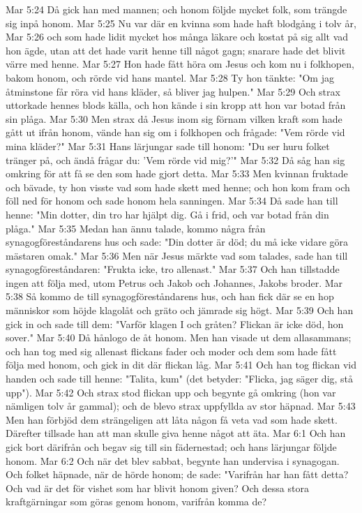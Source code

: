 Mar 5:24  Då gick han med mannen; och honom följde mycket folk, som trängde sig inpå honom.
Mar 5:25  Nu var där en kvinna som hade haft blodgång i tolv år,
Mar 5:26  och som hade lidit mycket hos många läkare och kostat på sig allt vad hon ägde, utan att det hade varit henne till något gagn; snarare hade det blivit värre med henne.
Mar 5:27  Hon hade fått höra om Jesus och kom nu i folkhopen, bakom honom, och rörde vid hans mantel.
Mar 5:28  Ty hon tänkte: "Om jag åtminstone får röra vid hans kläder, så bliver jag hulpen."
Mar 5:29  Och strax uttorkade hennes blods källa, och hon kände i sin kropp att hon var botad från sin plåga.
Mar 5:30  Men strax då Jesus inom sig förnam vilken kraft som hade gått ut ifrån honom, vände han sig om i folkhopen och frågade: "Vem rörde vid mina kläder?"
Mar 5:31  Hans lärjungar sade till honom: "Du ser huru folket tränger på, och ändå frågar du: 'Vem rörde vid mig?'"
Mar 5:32  Då såg han sig omkring för att få se den som hade gjort detta.
Mar 5:33  Men kvinnan fruktade och bävade, ty hon visste vad som hade skett med henne; och hon kom fram och föll ned för honom och sade honom hela sanningen.
Mar 5:34  Då sade han till henne: "Min dotter, din tro har hjälpt dig. Gå i frid, och var botad från din plåga."
Mar 5:35  Medan han ännu talade, kommo några från synagogföreståndarens hus och sade: "Din dotter är död; du må icke vidare göra mästaren omak."
Mar 5:36  Men när Jesus märkte vad som talades, sade han till synagogföreståndaren: "Frukta icke, tro allenast."
Mar 5:37  Och han tillstadde ingen att följa med, utom Petrus och Jakob och Johannes, Jakobs broder.
Mar 5:38  Så kommo de till synagogföreståndarens hus, och han fick där se en hop människor som höjde klagolåt och gräto och jämrade sig högt.
Mar 5:39  Och han gick in och sade till dem: "Varför klagen I och gråten? Flickan är icke död, hon sover."
Mar 5:40  Då hånlogo de åt honom. Men han visade ut dem allasammans; och han tog med sig allenast flickans fader och moder och dem som hade fått följa med honom, och gick in dit där flickan låg.
Mar 5:41  Och han tog flickan vid handen och sade till henne: "Talita, kum" (det betyder: "Flicka, jag säger dig, stå upp").
Mar 5:42  Och strax stod flickan upp och begynte gå omkring (hon var nämligen tolv år gammal); och de blevo strax uppfyllda av stor häpnad.
Mar 5:43  Men han förbjöd dem strängeligen att låta någon få veta vad som hade skett. Därefter tillsade han att man skulle giva henne något att äta.
Mar 6:1  Och han gick bort därifrån och begav sig till sin fädernestad; och hans lärjungar följde honom.
Mar 6:2  Och när det blev sabbat, begynte han undervisa i synagogan. Och folket häpnade, när de hörde honom; de sade: "Varifrån har han fått detta? Och vad är det för vishet som har blivit honom given? Och dessa stora kraftgärningar som göras genom honom, varifrån komma de?
